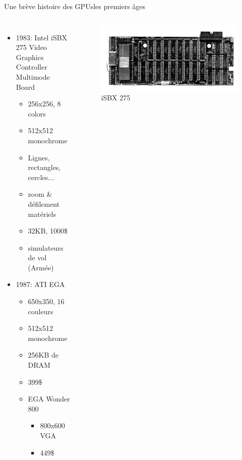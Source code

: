 \documentclass[11pt,mathserif]{beamer}
\newcommand{\pozik}{\faSmileO}
\newcommand{\harritu}{\faExclamation}
\begin{document}
\begin{frame}{Une brève histoire des GPUs}{les premiers âges}
  \begin{columns}[t]
    \column{7cm}
    \begin{itemize}[<+->]
     \item 1983: Intel iSBX 275 Video Graphics 
    Controller Multimode Board
    \begin{itemize}
      \item 256x256, 8 colors
  \item 512x512 monochrome
  \item Lignes, rectangles, cercles...
  \item zoom \& défilement matériels
  \item 32KB, 1000\$ \harritu
  \item simulateurs de vol (Armée)
    \end{itemize} 
    \item 1987: ATI EGA
      \begin{itemize}
        \item 650x350, 16 couleurs
        \item 512x512 monochrome
        \item 256KB de DRAM
        \item 399\$ \pozik
        \item EGA Wonder 800
        \begin{itemize}
          \item  800x600 VGA
          \item  449\$
        \end{itemize} 
      \end{itemize} 
   \end{itemize} 
    \column{5cm}
    \begin{figure}[htbp]
  \includegraphics[width=0.8\linewidth]{fig/sbx2.png}
      \caption{\tiny iSBX 275}

\end{figure}
\end{columns}
\end{frame}
\end{document}
